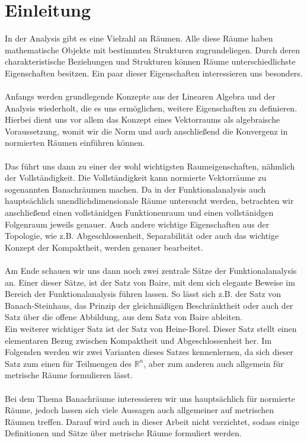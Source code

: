 \documentclass[10pt,a4paper]{article}
\theoremstyle{plain}
\theoremstyle{definition}
\theoremstyle{nonumberplain}
\newcommand{\R}{\mathbb{R}}
\begin{document}
\section*{Einleitung}
In der Analysis gibt es eine Vielzahl an Räumen. Alle diese Räume haben mathematische Objekte mit bestimmten Strukturen zugrundeliegen. Durch deren charakteristische Beziehungen und Strukturen können Räume unterschiedlichste Eigenschaften besitzen. Ein paar dieser Eigenschaften interessieren uns besonders. \\\\Anfangs werden grundlegende Konzepte aus der Linearen Algebra und der Analysis wiederholt, die es uns ermöglichen, weitere Eigenschaften zu definieren. Hierbei dient uns vor allem das Konzept eines Vektorraums als algebraische Voraussetzung, womit wir die Norm und auch anschließend die Konvergenz in normierten Räumen  einführen können. \\\\Das führt uns dann zu einer der wohl wichtigsten Raumeigenschaften, nähmlich der Vollständigkeit. Die Vollständigkeit kann normierte Vektorräume zu sogenannten Banachräumen machen. Da in der Funktionalanalysis auch hauptsächlich unendlichdimensionale Räume untersucht werden, betrachten wir anschließend einen vollstänidgen Funktionenraum und einen vollstänidgen Folgenraum jeweils genauer. Auch andere wichtige Eigenschaften aus der Topologie, wie z.B. Abgeschlossenheit, Separabilität oder auch das wichtige Konzept der Kompaktheit, werden genauer bearbeitet.  \\\\Am Ende schauen wir uns dann noch zwei zentrale Sätze der Funktionalanalysis an. Einer dieser Sätze, ist der Satz von Baire, mit dem sich elegante Beweise im Bereich der Funktionalanalysis führen lassen. So lässt sich z.B. der Satz von Banach-Steinhaus, das Prinzip der gleichmäßigen Beschränktheit oder auch der Satz über die offene Abbildung, aus dem Satz von Baire ableiten.\\ Ein weiterer wichtiger Satz ist der Satz von Heine-Borel. Dieser Satz stellt einen elementaren Bezug zwischen Kompaktheit und Abgeschlossenheit her. Im Folgenden werden wir zwei Varianten dieses Satzes kennenlernen, da sich dieser Satz zum einen für Teilmengen des $\R^n$, aber zum anderen auch allgemein für metrische Räume formulieren lässt. \\\\Bei dem Thema Banachräume interessieren wir uns hauptsächlich für normierte Räume, jedoch lassen sich viele Aussagen auch allgemeiner auf metrischen Räumen treffen. Darauf wird auch in dieser Arbeit nicht verzichtet, sodass einige Definitionen und Sätze über metrische Räume formuliert werden.
\newpage
\end{document}
